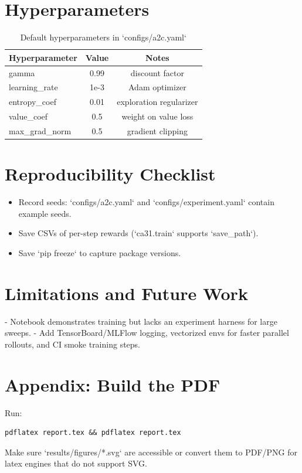 \documentclass[11pt]{article}
\begin{document}
\section{Hyperparameters}
\begin{table}[h]
\centering
\begin{tabular}{lcc}
\toprule
Hyperparameter & Value & Notes \\
\midrule
gamma & 0.99 & discount factor \\
learning\_rate & 1e-3 & Adam optimizer \\
entropy\_coef & 0.01 & exploration regularizer \\
value\_coef & 0.5 & weight on value loss \\
max\_grad\_norm & 0.5 & gradient clipping \\
\bottomrule
\end{tabular}
\caption{Default hyperparameters in `configs/a2c.yaml`}
\end{table}
\section{Reproducibility Checklist}
\begin{itemize}
  \item Record seeds: `configs/a2c.yaml` and `configs/experiment.yaml` contain example seeds.
  \item Save CSVs of per-step rewards (`ca31.train` supports `save_path`).
  \item Save `pip freeze` to capture package versions.
\end{itemize}
\section{Limitations and Future Work}
- Notebook demonstrates training but lacks an experiment harness for large sweeps.
- Add TensorBoard/MLFlow logging, vectorized envs for faster parallel rollouts,
  and CI smoke training steps.
\section*{Appendix: Build the PDF}
Run:
\begin{verbatim}
pdflatex report.tex && pdflatex report.tex
\end{verbatim}
Make sure `results/figures/*.svg` are accessible or convert them to PDF/PNG for
latex engines that do not support SVG.
\end{document}
